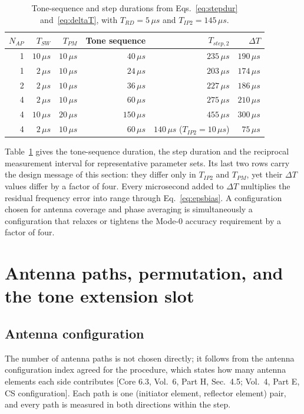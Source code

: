 \documentclass[11pt,a4paper]{article}
\newcommand{\us}{\,\ensuremath{\upmu}s}
\newcommand{\Tsw}{T_{SW}}
\newcommand{\Tpm}{T_{PM}}
\newcommand{\Trd}{T_{RD}}
\newcommand{\Tipp}{T_{IP2}}
\newcommand{\Nap}{N_{AP}}
\providecommand{\upmu}{\mu}
\newcommand{\core}[1]{\textcolor{rulegrey}{\small[Core 6.3, #1]}}
\begin{document}
\begin{table}[h]
\caption{Tone-sequence and step durations from Eqs.~\eqref{eq:stepdur} and~\eqref{eq:deltaT}, with
$\Trd = 5\us$ and $\Tipp = 145\us$.}
\label{tab:durations}
\centering\small
\begin{tabular}{@{}rrrrrr@{}}
\toprule
$\Nap$ & $\Tsw$ & $\Tpm$ & Tone sequence & $T_{step,2}$ & $\Delta T$ \\
\midrule
1 & $10\us$ & $10\us$ & $40\us$  & $235\us$ & $190\us$ \\
1 & $2\us$  & $10\us$ & $24\us$  & $203\us$ & $174\us$ \\
2 & $2\us$  & $10\us$ & $36\us$  & $227\us$ & $186\us$ \\
4 & $2\us$  & $10\us$ & $60\us$  & $275\us$ & $210\us$ \\
4 & $10\us$ & $20\us$ & $150\us$ & $455\us$ & $300\us$ \\
4 & $2\us$  & $10\us$ & $60\us$  & $140\us$ ($\Tipp=10\us$) & $75\us$ \\
\bottomrule
\end{tabular}
\end{table}

Table~\ref{tab:durations} gives the tone-sequence duration, the step duration and the reciprocal
measurement interval for representative parameter sets. Its last two rows carry the design message
of this section: they differ only in $\Tipp$ and $\Tpm$, yet their $\Delta T$ values differ by a
factor of four. Every microsecond added to $\Delta T$
multiplies the residual frequency error into range through Eq.~\eqref{eq:epsbias}. A configuration
chosen for antenna coverage and phase averaging is simultaneously a configuration that relaxes or
tightens the Mode-0 accuracy requirement by a factor of four.

\section{Antenna paths, permutation, and the tone extension slot}
\label{sec:antenna}

\subsection{Antenna configuration}

The number of antenna paths is not chosen directly; it follows from the antenna configuration index
agreed for the procedure, which states how many antenna elements each side contributes
\core{Vol.\ 6, Part H, Sec.\ 4.5; Vol.\ 4, Part E, CS configuration}. Each path is one
(initiator element, reflector element) pair, and every path is measured in both directions within
the step.
\end{document}
